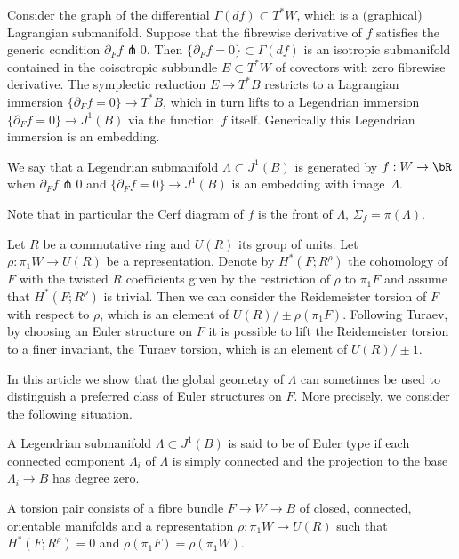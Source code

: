 Consider the graph of the differential $\Gamma(df) \subset T^*W$, which is a (graphical) Lagran\-gian submanifold. Suppose that the fibrewise derivative of $f$ satisfies the generic condition $\partial_F f \pitchfork 0 $. Then $ \{ \partial_F f = 0 \} \subset \Gamma(df)$ is an isotropic submanifold contained in the coisotropic subbundle $E \subset T^*W$ of covectors with zero fibrewise derivative. The symplectic reduction $E \to T^*B$ restricts to a Lagrangian immersion $\{ \partial_F f= 0 \} \to T^*B$, which in turn lifts to a Legendrian immersion $\{ \partial_Ff = 0 \} \to J^1(B)$ via the function~$f$ itself. Generically this Legendrian immersion is an embedding.

\begin{definition} We say that a Legendrian submanifold $\Lambda \subset J^1(B)$ is generated by $f:W \to \bR$ when $\partial_F f \pitchfork 0 $ and $\{ \partial_F f = 0 \} \to J^1 (B)$ is an embedding with image~$\Lambda$.
\end{definition}

\begin{remark}
Note that in particular the Cerf diagram of $f$ is the front of $\Lambda$, \ie $\Sigma_f=\pi(\Lambda)$.
\end{remark}

Let $R$ be a commutative ring and $U(R)$ its group of units. Let $\rho: \pi_1W \to U(R)$ be a representation. Denote by $H^*(F;R^\rho)$ the cohomology of $F$ with the twisted $R$ coefficients given by the restriction of $\rho$ to $\pi_1F$ and assume that $H^*(F;R^\rho)$ is trivial. Then we can consider the Reidemeister torsion of $F$ with respect to $\rho$, which is an element of $U(R) / \pm \rho(\pi_1F)$. Following Turaev, by choosing an Euler structure on $F$ it is possible to lift the Reidemeister torsion to a finer invariant, the Turaev torsion, which is an element of $U(R) / \pm 1$.

In this article we show that the global geometry of
$\Lambda$ can sometimes be used to distinguish a preferred class of Euler structures on $F$. More precisely, we consider the following situation.

\begin{definition}
A Legendrian submanifold $\Lambda \subset J^1(B)$ is said to be of Euler type if each connected component $\Lambda_i$ of $\Lambda$ is simply connected and the projection to the base $\Lambda_i \to B$ has degree zero.
\end{definition}

\begin{definition}
A torsion pair consists of a fibre bundle $F \to W \to B$ of closed, connected, orientable manifolds and a representation $\rho:\pi_1W \to U(R)$ such that $H^*(F;R^\rho)=0$ and $\rho(\pi_1F)=\rho(\pi_1W)$.
\end{definition}

